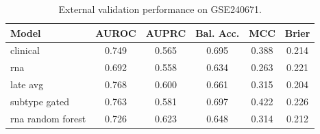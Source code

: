 \begin{table}[t]
\caption{External validation performance on GSE240671.}\label{tab:external}
\centering\small
\begin{tabular}{lccccc}\hline
Model & AUROC & AUPRC & Bal. Acc. & MCC & Brier\\\hline
clinical & 0.749 & 0.565 & 0.695 & 0.388 & 0.214\\
rna & 0.692 & 0.558 & 0.634 & 0.263 & 0.221\\
late avg & 0.768 & 0.600 & 0.661 & 0.315 & 0.204\\
subtype gated & 0.763 & 0.581 & 0.697 & 0.422 & 0.226\\
rna random forest & 0.726 & 0.623 & 0.648 & 0.314 & 0.212\\
\hline\end{tabular}\end{table}

